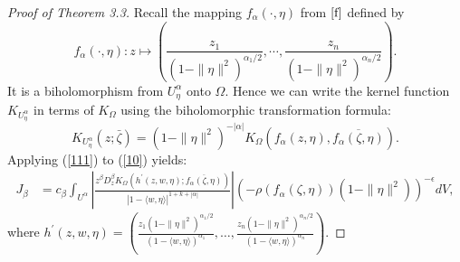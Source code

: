 \documentclass[reqno,12pt]{amsart}
\numberwithin{equation}{section}
\begin{document}
\begin{proof}[Proof of Theorem 3.3]
{		Recall the mapping $f_\alpha(\cdot,\eta)$ from $\ref{f}$ defined by 
			\begin{equation}
				f_\alpha(\cdot,\eta ):z\mapsto\left(\frac{z_1}{(1-\|\eta\|^2)^{\alpha_1/2}},\cdots,\frac{z_n}{(1-\|\eta\|^2)^{\alpha_n/2}}\right).
			\end{equation}
		It	is a biholomorphism from $U^\alpha_\eta$ onto $\Omega$. Hence we can write the kernel function $K_{U^{\alpha}_\eta}$ in terms of $K_\Omega$ using the biholomorphic transformation formula:
		\begin{equation}\label{111}
		K_{U^{\alpha}_\eta}(z;\bar\zeta)=(1-\|\eta\|^2)^{-|\alpha|}K_\Omega(f_\alpha(z,\eta),\overline{f_\alpha(\zeta,\eta)}).
		\end{equation}}
			Applying (\ref{111}) to (\ref{10}) yields:
			\begin{align}\label{11}
			J_\beta&=c_\beta\int_{U^{\alpha}}\left|\frac{z^{\beta}{D^{\beta}_z}K_{\Omega}\left(h^{\prime}(z,w,\eta) ;\overline{f_{\alpha}(\zeta,\eta)} \right)}{|1- \langle w,\eta\rangle|^{1+k+|\alpha|}}\right|\left(-\rho\left(f_\alpha(\zeta,\eta) \right)(1-\|\eta\|^2)\right)^{-\epsilon}dV,
			\end{align}
			where $h^{\prime}(z,w,\eta)=\left(\frac{z_1(1-\|\eta\|^2)^{\alpha_1/2}}{(1-\langle w,{\eta}\rangle)^{\alpha_1}},\dots, \frac{z_n(1-\|\eta\|^2)^{\alpha_n/2}}{(1-\langle w, {\eta}\rangle)^{\alpha_n}}\right)$. 
			

\end{proof}
\end{document}

